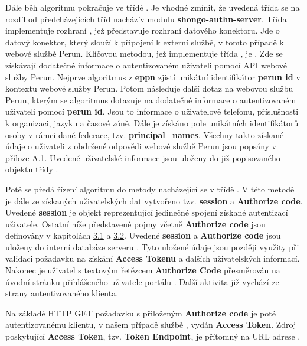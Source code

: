 \documentclass[
  printed, %
  twoside, %
  table,   %
  nolof,     %
  nolot,     %
]{fithesis3}
\begin{document}
\label{sec:responseAction}
Dále běh algoritmu pokračuje ve třídě . Je vhodné zmínit, že uvedená třída  se na rozdíl od předcházejících tříd nachází\break v modulu \textbf{shongo-authn-server}. Třída  implementuje rozhraní , jež představuje rozhraní datového konektoru. Jde o datový konektor, který slouží k připojení k externí službě, v tomto případě k webové službě Perun. Klíčovou metodou, jež implementuje třída , je . Zde se získávají dodatečné informace o autentizovaném uživateli pomocí API webové služby Perun. Nejprve algoritmus z \textbf{eppn} zjistí unikátní identifikátor \textbf{perun id} v kontextu webové služby Perun. Potom následuje další dotaz na webovou službu Perun, kterým se algoritmus dotazuje na dodatečné informace o autentizovaném uživateli pomocí \textbf{perun id}. Jsou to informace o uživatelově telefonu, příslušnosti k organizaci, jazyku a časové zóně. Dále je získáno pole unikátních identifikátorů osoby v rámci dané federace, tzv. \textbf{principal\_names}. Všechny takto získané údaje o uživateli z obdržené odpovědi webové službě Perun jsou popsány v příloze \hyperref[table:perunws:user]{A.1}. Uvedené uživatelské informace jsou uloženy do již popisovaného objektu třídy . \par

Poté se předá řízení algoritmu do metody  nacházející se v třídě . V této metodě je dále ze získaných uživatelských dat vytvořeno tzv. \textbf{session} a \textbf{Authorize code}. Uvedené \textbf{session} je objekt reprezentující jedinečné spojení získané autentizací uživatele. Ostatní níže představené pojmy včetně \textbf{Authorize code} jsou definovány v kapitolách \hyperref[sec:oauth]{3.1} a \hyperref[sec:oidc]{3.2}. Uvedené \textbf{session} a \textbf{Authorize code} jsou uloženy do interní databáze serveru . Tyto uložené údaje jsou později využity při validaci požadavku na získání \textbf{Access Tokenu} a dalších uživatelských informací. Nakonec je uživatel s textovým řetězcem \textbf{Authorize Code} přesměrován na úvodní stránku přihlášeného uživatele portálu . Další aktivita již vychází ze strany autentizovaného klienta.\par

Na základě HTTP GET požadavku s přiloženým \textbf{Authorize code} je poté autentizovanému klientu, v našem případě službě , vydán \textbf{Access Token}. Zdroj poskytující \textbf{Access Token}, tzv. \textbf{Token Endpoint}, je přítomný na URL adrese . \par
\end{document}
